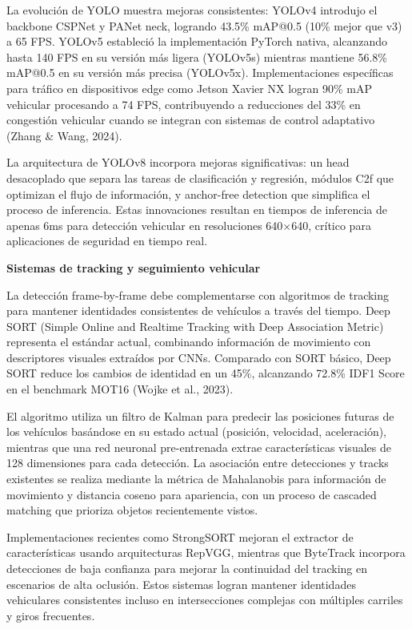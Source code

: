 \documentclass[12pt,a4paper,oneside]{report}
\begin{document}
La evolución de YOLO muestra mejoras consistentes: YOLOv4 introdujo el backbone CSPNet y PANet neck, logrando 43.5\% mAP@0.5 (10\% mejor que v3) a 65 FPS. YOLOv5 estableció la implementación PyTorch nativa, alcanzando hasta 140 FPS en su versión más ligera (YOLOv5s) mientras mantiene 56.8\% mAP@0.5 en su versión más precisa (YOLOv5x). Implementaciones específicas para tráfico en dispositivos edge como Jetson Xavier NX logran 90\% mAP vehicular procesando a 74 FPS, contribuyendo a reducciones del 33\% en congestión vehicular cuando se integran con sistemas de control adaptativo (Zhang \& Wang, 2024).

La arquitectura de YOLOv8 incorpora mejoras significativas: un head desacoplado que separa las tareas de clasificación y regresión, módulos C2f que optimizan el flujo de información, y anchor-free detection que simplifica el proceso de inferencia. Estas innovaciones resultan en tiempos de inferencia de apenas 6ms para detección vehicular en resoluciones 640\ensuremath{\times}640, crítico para aplicaciones de seguridad en tiempo real.

\textbf{Sistemas de tracking y seguimiento vehicular}

La detección frame-by-frame debe complementarse con algoritmos de tracking para mantener identidades consistentes de vehículos a través del tiempo. Deep SORT (Simple Online and Realtime Tracking with Deep Association Metric) representa el estándar actual, combinando información de movimiento con descriptores visuales extraídos por CNNs. Comparado con SORT básico, Deep SORT reduce los cambios de identidad en un 45\%, alcanzando 72.8\% IDF1 Score en el benchmark MOT16 (Wojke et al., 2023).

El algoritmo utiliza un filtro de Kalman para predecir las posiciones futuras de los vehículos basándose en su estado actual (posición, velocidad, aceleración), mientras que una red neuronal pre-entrenada extrae características visuales de 128 dimensiones para cada detección. La asociación entre detecciones y tracks existentes se realiza mediante la métrica de Mahalanobis para información de movimiento y distancia coseno para apariencia, con un proceso de cascaded matching que prioriza objetos recientemente vistos.

Implementaciones recientes como StrongSORT mejoran el extractor de características usando arquitecturas RepVGG, mientras que ByteTrack incorpora detecciones de baja confianza para mejorar la continuidad del tracking en escenarios de alta oclusión. Estos sistemas logran mantener identidades vehiculares consistentes incluso en intersecciones complejas con múltiples carriles y giros frecuentes.
\end{document}
